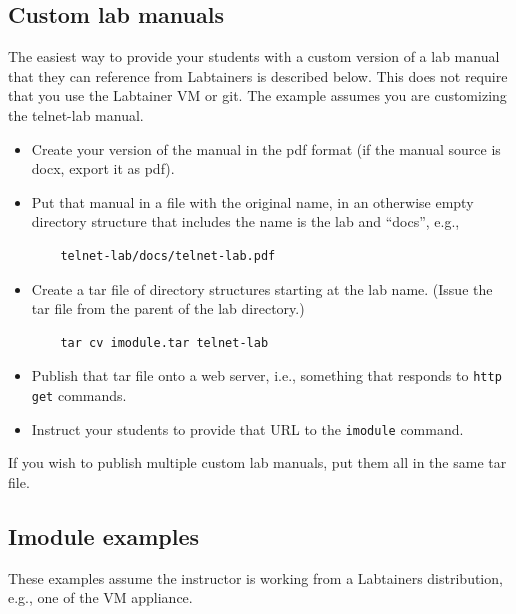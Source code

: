 \documentclass[12pt]{article}
\begin{document}
\subsection {Custom lab manuals}
The easiest way to provide your students with a custom version of a lab manual that they can reference from Labtainers
is described below.  This does not require that you use the Labtainer VM or git. The example assumes you are customizing
the telnet-lab manual.
\begin{itemize}
\item Create your version of the manual in the pdf format (if the manual source is docx, export it as pdf).
\item Put that manual in a file with the original name, in an otherwise empty directory structure that includes the name is the lab
and ``docs'', e.g.,
\begin{verbatim}
    telnet-lab/docs/telnet-lab.pdf
\end{verbatim}
\item Create a tar file of directory structures starting at the lab name.  (Issue the tar file from the parent of the lab directory.)
\begin{verbatim}
    tar cv imodule.tar telnet-lab
\end{verbatim}
\item Publish that tar file onto a web server, i.e., something that responds to {\tt http get} commands.
\item Instruct your students to provide that URL to the {\tt imodule} command. 
\end{itemize}
If you wish to publish multiple custom lab manuals, put them all in the same tar file.
\subsection {Imodule examples}  
These examples assume the instructor is working from a Labtainers distribution, e.g., one
of the VM appliance.
\end{document}
